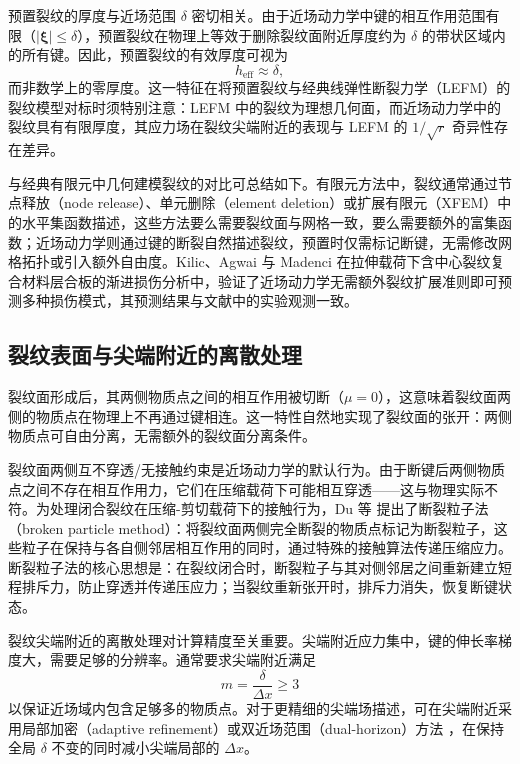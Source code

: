 预置裂纹的厚度与近场范围 $\delta$ 密切相关。由于近场动力学中键的相互作用范围有限（$|\boldsymbol{\xi}|\le\delta$），预置裂纹在物理上等效于删除裂纹面附近厚度约为 $\delta$ 的带状区域内的所有键。因此，预置裂纹的有效厚度可视为
\begin{equation}
h_{\mathrm{eff}}\approx\delta,
\label{eq:ch11-precrack-thickness}
\end{equation}
而非数学上的零厚度。这一特征在将预置裂纹与经典线弹性断裂力学（LEFM）的裂纹模型对标时须特别注意：LEFM 中的裂纹为理想几何面，而近场动力学中的裂纹具有有限厚度，其应力场在裂纹尖端附近的表现与 LEFM 的 $1/\sqrt{r}$ 奇异性存在差异。

与经典有限元中几何建模裂纹的对比可总结如下。有限元方法中，裂纹通常通过节点释放（node release）、单元删除（element deletion）或扩展有限元（XFEM）中的水平集函数描述，这些方法要么需要裂纹面与网格一致，要么需要额外的富集函数；近场动力学则通过键的断裂自然描述裂纹，预置时仅需标记断键，无需修改网格拓扑或引入额外自由度。Kilic、Agwai 与 Madenci \cite{KilicAgwaiMadenci2009} 在拉伸载荷下含中心裂纹复合材料层合板的渐进损伤分析中，验证了近场动力学无需额外裂纹扩展准则即可预测多种损伤模式，其预测结果与文献中的实验观测一致。

\subsection{裂纹表面与尖端附近的离散处理}\label{sec:ch11-crack-surface}

裂纹面形成后，其两侧物质点之间的相互作用被切断（$\mu=0$），这意味着裂纹面两侧的物质点在物理上不再通过键相连。这一特性自然地实现了裂纹面的张开：两侧物质点可自由分离，无需额外的裂纹面分离条件。

裂纹面两侧互不穿透/无接触约束是近场动力学的默认行为。由于断键后两侧物质点之间不存在相互作用力，它们在压缩载荷下可能相互穿透——这与物理实际不符。为处理闭合裂纹在压缩-剪切载荷下的接触行为，Du 等 \cite{Du2020} 提出了断裂粒子法（broken particle method）：将裂纹面两侧完全断裂的物质点标记为断裂粒子，这些粒子在保持与各自侧邻居相互作用的同时，通过特殊的接触算法传递压缩应力。断裂粒子法的核心思想是：在裂纹闭合时，断裂粒子与其对侧邻居之间重新建立短程排斥力，防止穿透并传递压应力；当裂纹重新张开时，排斥力消失，恢复断键状态。

裂纹尖端附近的离散处理对计算精度至关重要。尖端附近应力集中，键的伸长率梯度大，需要足够的分辨率。通常要求尖端附近满足
\begin{equation}
m=\frac{\delta}{\Delta x}\ge 3
\label{eq:ch11-tip-refinement}
\end{equation}
以保证近场域内包含足够多的物质点。对于更精细的尖端场描述，可在尖端附近采用局部加密（adaptive refinement）或双近场范围（dual-horizon）方法 \cite{Ren2017dualhorizon}，在保持全局 $\delta$ 不变的同时减小尖端局部的 $\Delta x$。

